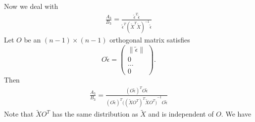 \documentclass[review]{elsarticle}
\theoremstyle{plain}
\theoremstyle{definition}
\theoremstyle{remark}
\begin{document}
Now we deal with 
\begin{equation}
    \begin{aligned}
        \frac{A_3}{B_3}=\frac{\tilde{\epsilon}^T\tilde{\epsilon}
    }{\tilde{\epsilon}^T{(\tilde{X}^T\tilde{X})}^{-1}\tilde{\epsilon}
        }
    \end{aligned}
\end{equation}
Let $O$ be an $(n-1)\times (n-1)$ orthogonal matrix satisfies 
\[
    O\tilde{\epsilon}=
    \begin{pmatrix}
        \|\tilde{\epsilon}\|\\
        0\\
        \ldots\\
        0
    \end{pmatrix}.
    \]
Then
\begin{equation}
    \begin{aligned}
        \frac{A_3}{B_3}=\frac{{(O\tilde{\epsilon})}^T O\tilde{\epsilon}
        }{{(O\tilde{\epsilon})}^T{\big({(\tilde{X}O^T)}^T\tilde{X}O^T\big)}^{-1} O\tilde{\epsilon}
        }
    \end{aligned}
\end{equation}
Note that $\tilde{X}O^T$ has the same distribution as $\tilde{X}$ and is independent of $O$. We have
\end{document}
